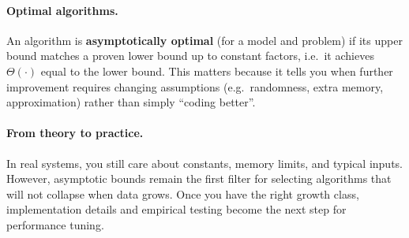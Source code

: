 \documentclass[12pt]{scrartcl}
\begin{document}
\paragraph{Optimal algorithms.}
An algorithm is \textbf{asymptotically optimal} (for a model and problem) if its upper bound matches a proven lower bound up to constant factors, i.e.\ it achieves \(\Theta(\cdot)\) equal to the lower bound. This matters because it tells you when further improvement requires changing assumptions (e.g.\ randomness, extra memory, approximation) rather than simply ``coding better''.

\paragraph{From theory to practice.}
In real systems, you still care about constants, memory limits, and typical inputs. However, asymptotic bounds remain the first filter for selecting algorithms that will not collapse when data grows. Once you have the right growth class, implementation details and empirical testing become the next step for performance tuning.
\end{document}
